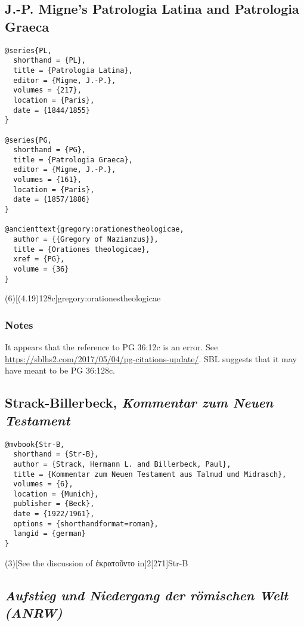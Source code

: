 \documentclass[a4paper]{article}
\begin{document}
\subsection{J.-P. Migne’s Patrologia Latina and Patrologia Graeca}

\begin{verbatim}
@series{PL,
  shorthand = {PL},
  title = {Patrologia Latina},
  editor = {Migne, J.-P.},
  volumes = {217},
  location = {Paris},
  date = {1844/1855}
}

@series{PG,
  shorthand = {PG},
  title = {Patrologia Graeca},
  editor = {Migne, J.-P.},
  volumes = {161},
  location = {Paris},
  date = {1857/1886}
}

@ancienttext{gregory:orationestheologicae,
  author = {{Gregory of Nazianzus}},
  title = {Orationes theologicae},
  xref = {PG},
  volume = {36}
}
\end{verbatim}

\examplecite(6)[(4.19)128c]{gregory:orationestheologicae}
\begin{verbcite}
  \nocite{PL}
\end{verbcite}
\exampleabbreviations

\subsubsection{Notes}

It appears that the reference to PG 36:12c is an error. See
\url{https://sblhs2.com/2017/05/04/pg-citations-update/}. SBL suggests that it
may have meant to be PG 36:128c.

\subsection{Strack-Billerbeck, \emph{Kommentar zum Neuen Testament}}

\begin{verbatim}
@mvbook{Str-B,
  shorthand = {Str-B},
  author = {Strack, Hermann L. and Billerbeck, Paul},
  title = {Kommentar zum Neuen Testament aus Talmud und Midrasch},
  volumes = {6},
  location = {Munich},
  publisher = {Beck},
  date = {1922/1961},
  options = {shorthandformat=roman},
  langid = {german}
}
\end{verbatim}

\examplevolcite(3)[See the discussion of ἐκρατοῦντο in]{2}[271]{Str-B}
\exampleabbreviations
\examplebibliography

\subsection{\emph{Aufstieg und Niedergang der römischen Welt (ANRW)}}
\end{document}
